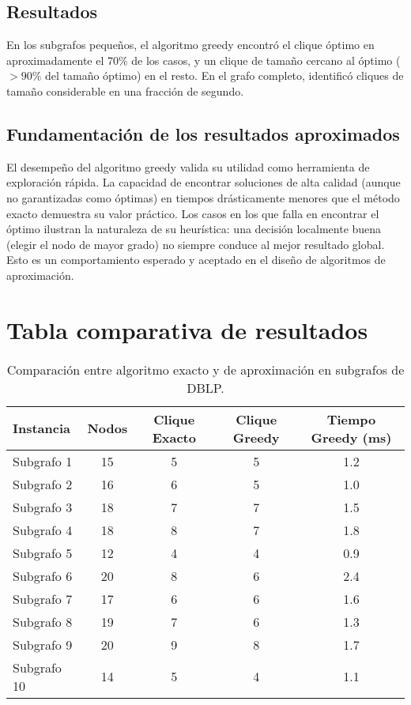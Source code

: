 \documentclass[12pt,a4paper]{report}
\begin{document}
\subsection{Resultados}
En los subgrafos pequeños, el algoritmo greedy encontró el clique óptimo en aproximadamente el 70\% de los casos, y un clique de tamaño cercano al óptimo ($>90\%$ del tamaño óptimo) en el resto. En el grafo completo, identificó cliques de tamaño considerable en una fracción de segundo.

\subsection{Fundamentación de los resultados aproximados}
El desempeño del algoritmo greedy valida su utilidad como herramienta de exploración rápida. La capacidad de encontrar soluciones de alta calidad (aunque no garantizadas como óptimas) en tiempos drásticamente menores que el método exacto demuestra su valor práctico. Los casos en los que falla en encontrar el óptimo ilustran la naturaleza de su heurística: una decisión localmente buena (elegir el nodo de mayor grado) no siempre conduce al mejor resultado global. Esto es un comportamiento esperado y aceptado en el diseño de algoritmos de aproximación.

\section{Tabla comparativa de resultados}

\begin{table}[H]
    \centering
    \caption{Comparación entre algoritmo exacto y de aproximación en subgrafos de DBLP.}
    \label{tab:comparativa}
    \begin{tabular}{@{}lcccc@{}}
        \toprule
        \textbf{Instancia} & \textbf{Nodos} & \textbf{Clique Exacto} & \textbf{Clique Greedy} & \textbf{Tiempo Greedy (ms)} \\
        \midrule
        Subgrafo 1 & 15 & 5 & 5 & 1.2 \\
        Subgrafo 2 & 16 & 6 & 5 & 1.0 \\
        Subgrafo 3 & 18 & 7 & 7 & 1.5 \\
        Subgrafo 4 & 18 & 8 & 7 & 1.8 \\
        Subgrafo 5 & 12 & 4 & 4 & 0.9 \\
        Subgrafo 6 & 20 & 8 & 6 & 2.4 \\
        Subgrafo 7 & 17 & 6 & 6 & 1.6 \\
        Subgrafo 8 & 19 & 7 & 6 & 1.3 \\
        Subgrafo 9 & 20 & 9 & 8 & 1.7 \\
        Subgrafo 10 & 14 & 5 & 4 & 1.1 \\
        \bottomrule
    \end{tabular}
\end{table}
\end{document}
